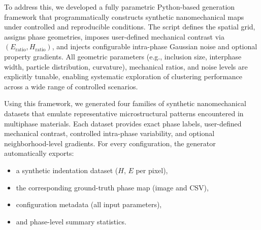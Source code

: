 \documentclass[final,3p,times]{elsarticle}
\begin{document}
To address this, we developed a fully parametric Python-based generation framework that programmatically constructs synthetic nanomechanical maps under controlled and reproducible conditions. The script defines the spatial grid, assigns phase geometries, imposes user-defined mechanical contrast via $(E_\mathrm{ratio}, H_\mathrm{ratio})$, and injects configurable intra-phase Gaussian noise and optional property gradients. All geometric parameters (e.g., inclusion size, interphase width, particle distribution, curvature), mechanical ratios, and noise levels are explicitly tunable, enabling systematic exploration of clustering performance across a wide range of controlled scenarios.

Using this framework, we generated four families of synthetic nanomechanical datasets that emulate representative microstructural patterns encountered in multiphase materials. Each dataset provides exact phase labels, user-defined mechanical contrast, controlled intra-phase variability, and optional neighborhood-level gradients. For every configuration, the generator automatically exports:
\begin{itemize}
    \item a synthetic indentation dataset ($H$, $E$ per pixel),
    \item the corresponding ground-truth phase map (image and CSV),
    \item configuration metadata (all input parameters),
    \item and phase-level summary statistics.
\end{itemize}
\end{document}
